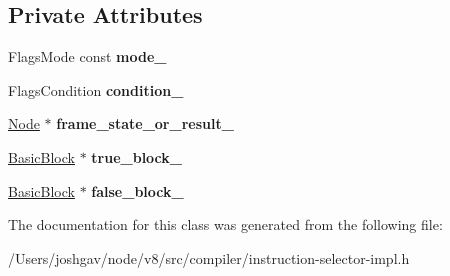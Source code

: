 \subsection*{Private Attributes}
\begin{DoxyCompactItemize}
\item 
Flags\+Mode const {\bfseries mode\+\_\+}\hypertarget{classv8_1_1internal_1_1compiler_1_1_flags_continuation_a0e5bfe495fa78d38b4235fb2be008817}{}\label{classv8_1_1internal_1_1compiler_1_1_flags_continuation_a0e5bfe495fa78d38b4235fb2be008817}

\item 
Flags\+Condition {\bfseries condition\+\_\+}\hypertarget{classv8_1_1internal_1_1compiler_1_1_flags_continuation_ae823a73a47b96502e185eddfea227587}{}\label{classv8_1_1internal_1_1compiler_1_1_flags_continuation_ae823a73a47b96502e185eddfea227587}

\item 
\hyperlink{classv8_1_1internal_1_1compiler_1_1_node}{Node} $\ast$ {\bfseries frame\+\_\+state\+\_\+or\+\_\+result\+\_\+}\hypertarget{classv8_1_1internal_1_1compiler_1_1_flags_continuation_a0efad959e16bfb6db251b9ac1c2d7b20}{}\label{classv8_1_1internal_1_1compiler_1_1_flags_continuation_a0efad959e16bfb6db251b9ac1c2d7b20}

\item 
\hyperlink{classv8_1_1internal_1_1compiler_1_1_basic_block}{Basic\+Block} $\ast$ {\bfseries true\+\_\+block\+\_\+}\hypertarget{classv8_1_1internal_1_1compiler_1_1_flags_continuation_a0f0b26290c2cfaeba3018e70220bbf27}{}\label{classv8_1_1internal_1_1compiler_1_1_flags_continuation_a0f0b26290c2cfaeba3018e70220bbf27}

\item 
\hyperlink{classv8_1_1internal_1_1compiler_1_1_basic_block}{Basic\+Block} $\ast$ {\bfseries false\+\_\+block\+\_\+}\hypertarget{classv8_1_1internal_1_1compiler_1_1_flags_continuation_a75211d76d6c33fdce8a728969a0d28fb}{}\label{classv8_1_1internal_1_1compiler_1_1_flags_continuation_a75211d76d6c33fdce8a728969a0d28fb}

\end{DoxyCompactItemize}


The documentation for this class was generated from the following file\+:\begin{DoxyCompactItemize}
\item 
/\+Users/joshgav/node/v8/src/compiler/instruction-\/selector-\/impl.\+h\end{DoxyCompactItemize}
